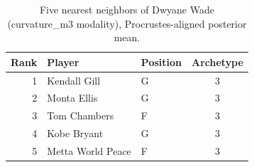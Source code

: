 \begin{table}[htbp]
  \centering\small
  \begin{tabular}{rllc}
    \toprule
    Rank & Player & Position & Archetype \\
    \midrule
    1 & Kendall Gill & G & 3 \\
    2 & Monta Ellis & G & 3 \\
    3 & Tom Chambers & F & 3 \\
    4 & Kobe Bryant & G & 3 \\
    5 & Metta World Peace & F & 3 \\
    \bottomrule
  \end{tabular}
  \caption{Five nearest neighbors of Dwyane Wade (curvature_m3 modality), Procrustes-aligned posterior mean.}
  \label{tab:Dwyane_Wade_neighbors_curvature_m3}
\end{table}

